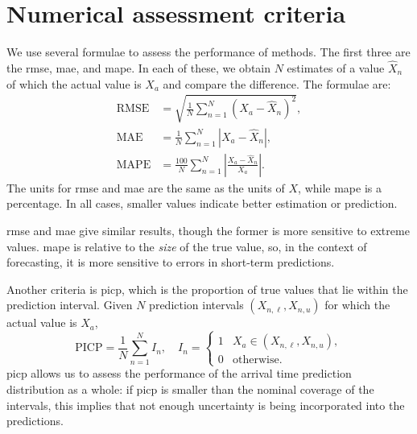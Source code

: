 \chapter{Numerical assessment criteria}
\label{app:error-functions}


We use several formulae to assess the performance of methods. The first three are the \gls{rmse}, \gls{mae}, and \gls{mape}. In each of these, we obtain $N$ estimates of a value $\hat X_n$ of which the actual value is $X_a$ and compare the difference. The formulae are:
\begin{align}
\label{eq:app_rmse}
\text{RMSE} &= \sqrt{\frac{1}{N}\sum_{n=1}^N \left(X_a - \hat X_n\right)^2}, \\
\label{eq:app_mae}
\text{MAE} &= \frac{1}{N}\sum_{n=1}^N \left|X_a - \hat X_n\right|, \\
\label{eq:app_mape}
\text{MAPE} &= \frac{100}{N}\sum_{n=1}^N \left|\frac{X_a - \hat X_n}{X_a}\right|.
\end{align}
The units for \gls{rmse} and \gls{mae} are the same as the units of $X$, while \gls{mape} is a percentage. In all cases, smaller values indicate better estimation or prediction.


\Gls{rmse} and \gls{mae} give similar results, though the former is more sensitive to extreme values. \gls{mape} is relative to the \emph{size} of the true value, so, in the context of forecasting, it is more sensitive to errors in short-term predictions.

Another criteria is \gls{picp}, which is the proportion of true values that lie within the prediction interval. Given $N$ prediction intervals $(X_{n,\ell}, X_{n,u})$ for which the actual value is $X_a$,
\begin{equation}
\label{eq:picp}
\text{PICP} = \frac{1}{N}\sum_{n=1}^N I_n, \quad
I_n =
\begin{cases}
1 & X_a \in (X_{n,\ell}, X_{n,u}), \\
0 & \text{otherwise.}
\end{cases}
\end{equation}
\Gls{picp} allows us to assess the performance of the arrival time prediction distribution as a whole: if \gls{picp} is smaller than the nominal coverage of the intervals, this implies that not enough uncertainty is being incorporated into the predictions.



